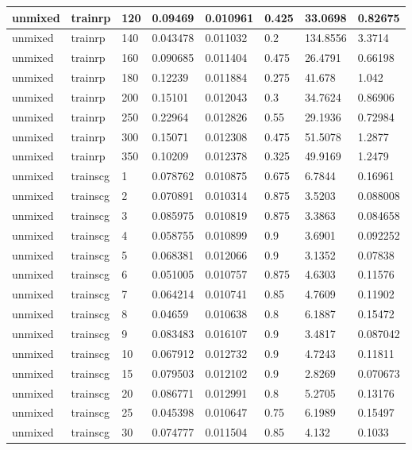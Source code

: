 \begin{longtable}{llllllll}
unmixed & trainrp & 120 & 0.09469 & 0.010961 & 0.425 & 33.0698 & 0.82675 \\ \hline 
unmixed & trainrp & 140 & 0.043478 & 0.011032 & 0.2 & 134.8556 & 3.3714 \\ \hline 
unmixed & trainrp & 160 & 0.090685 & 0.011404 & 0.475 & 26.4791 & 0.66198 \\ \hline 
unmixed & trainrp & 180 & 0.12239 & 0.011884 & 0.275 & 41.678 & 1.042 \\ \hline 
unmixed & trainrp & 200 & 0.15101 & 0.012043 & 0.3 & 34.7624 & 0.86906 \\ \hline 
unmixed & trainrp & 250 & 0.22964 & 0.012826 & 0.55 & 29.1936 & 0.72984 \\ \hline 
unmixed & trainrp & 300 & 0.15071 & 0.012308 & 0.475 & 51.5078 & 1.2877 \\ \hline 
unmixed & trainrp & 350 & 0.10209 & 0.012378 & 0.325 & 49.9169 & 1.2479 \\ \hline 
unmixed & trainscg & 1 & 0.078762 & 0.010875 & 0.675 & 6.7844 & 0.16961 \\ \hline 
unmixed & trainscg & 2 & 0.070891 & 0.010314 & 0.875 & 3.5203 & 0.088008 \\ \hline 
unmixed & trainscg & 3 & 0.085975 & 0.010819 & 0.875 & 3.3863 & 0.084658 \\ \hline 
unmixed & trainscg & 4 & 0.058755 & 0.010899 & 0.9 & 3.6901 & 0.092252 \\ \hline 
unmixed & trainscg & 5 & 0.068381 & 0.012066 & 0.9 & 3.1352 & 0.07838 \\ \hline 
unmixed & trainscg & 6 & 0.051005 & 0.010757 & 0.875 & 4.6303 & 0.11576 \\ \hline 
unmixed & trainscg & 7 & 0.064214 & 0.010741 & 0.85 & 4.7609 & 0.11902 \\ \hline 
unmixed & trainscg & 8 & 0.04659 & 0.010638 & 0.8 & 6.1887 & 0.15472 \\ \hline 
unmixed & trainscg & 9 & 0.083483 & 0.016107 & 0.9 & 3.4817 & 0.087042 \\ \hline 
unmixed & trainscg & 10 & 0.067912 & 0.012732 & 0.9 & 4.7243 & 0.11811 \\ \hline 
unmixed & trainscg & 15 & 0.079503 & 0.012102 & 0.9 & 2.8269 & 0.070673 \\ \hline 
unmixed & trainscg & 20 & 0.086771 & 0.012991 & 0.8 & 5.2705 & 0.13176 \\ \hline 
unmixed & trainscg & 25 & 0.045398 & 0.010647 & 0.75 & 6.1989 & 0.15497 \\ \hline 
unmixed & trainscg & 30 & 0.074777 & 0.011504 & 0.85 & 4.132 & 0.1033 \\ \hline 

\end{longtable}
